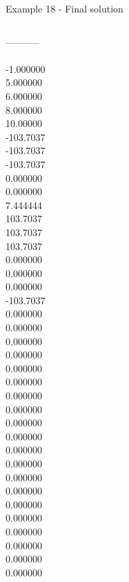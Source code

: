 \begin{frame}{Example 18 - Final solution}
\begin{columns}[t]
\begin{column}{0.3\textwidth}
-----------\\
\\
-1.000000\\
5.000000\\
6.000000\\
8.000000\\
10.00000\\
-103.7037\\
-103.7037\\
-103.7037\\
0.000000\\
0.000000\\
7.444444\\
103.7037\\
103.7037\\
103.7037\\
0.000000\\
0.000000\\
0.000000\\
-103.7037\\
0.000000\\
0.000000\\
0.000000\\
0.000000\\
0.000000\\
0.000000\\
0.000000\\
0.000000\\
0.000000\\
0.000000\\
0.000000\\
0.000000\\
0.000000\\
0.000000\\
0.000000\\
0.000000\\
0.000000\\
0.000000\\
0.000000\\
0.000000\\
\end{column}
\end{columns}
\end{frame}
